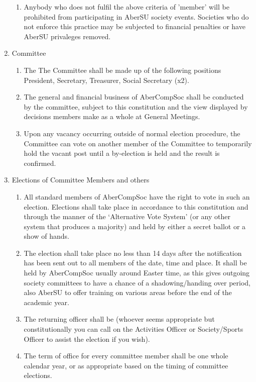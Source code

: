 \documentclass{article}
\begin{document}
\begin{enumerate}
\begin{enumerate}
            \item Anybody who does not fulfil the above criteria of 'member' will be prohibited from participating in AberSU society events. Societies who do not enforce this practice may be subjected to financial penalties or have AberSU privaleges removed.
        \end{enumerate}
    \item Committee
        \begin{enumerate}
            \item The The Committee shall be made up of the following positions President, Secretary, Treasurer, Social Secretary (x2).
            \item The general and financial business of AberCompSoc shall be conducted by the committee, subject to this constitution and the view displayed by decisions members make as a whole at General Meetings.
            \item Upon any vacancy occurring outside of normal election procedure, the Committee can vote on another member of the Committee to temporarily hold the vacant post until a by-election is held and the result is confirmed.
        \end{enumerate}
    \item Elections of Committee Members and others
        \begin{enumerate}
            \item All standard members of AberCompSoc have the right to vote in such an election. Elections shall take place in accordance to this constitution and through the manner of the ‘Alternative Vote System’ (or any other system that produces a majority) and held by either a secret ballot or a show of hands.
            \item The election shall take place no less than 14 days after the notification has been sent out to all members of the date, time and place. It shall be held by AberCompSoc usually around Easter time, as this gives outgoing society committees to have a chance of a shadowing/handing over period, also AberSU to offer training on various areas before the end of the academic year.
            \item The returning officer shall be (whoever seems appropriate but constitutionally you can call on the Activities Officer or Society/Sports Officer to assist the election if you wish).
            \item The term of office for every committee member shall be one whole calendar year, or as appropriate based on the timing of committee elections.

\end{enumerate}
\end{enumerate}
\end{document}

